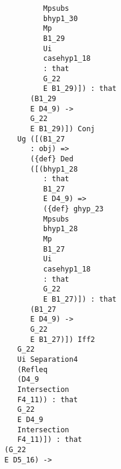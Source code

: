\documentclass[12pt]{article}
\begin{document}
\begin{verbatim}
                                                 Mpsubs 
                                                 bhyp1_30 
                                                 Mp 
                                                 B1_29 
                                                 Ui 
                                                 casehyp1_18 
                                                 : that 
                                                 G_22 
                                                 E B1_29)]) : that 
                                              (B1_29 
                                              E D4_9) -> 
                                              G_22 
                                              E B1_29)]) Conj 
                                           Ug ([(B1_27 
                                              : obj) => 
                                              ({def} Ded 
                                              ([(bhyp1_28 
                                                 : that 
                                                 B1_27 
                                                 E D4_9) => 
                                                 ({def} ghyp_23 
                                                 Mpsubs 
                                                 bhyp1_28 
                                                 Mp 
                                                 B1_27 
                                                 Ui 
                                                 casehyp1_18 
                                                 : that 
                                                 G_22 
                                                 E B1_27)]) : that 
                                              (B1_27 
                                              E D4_9) -> 
                                              G_22 
                                              E B1_27)]) Iff2 
                                           G_22 
                                           Ui Separation4 
                                           (Refleq 
                                           (D4_9 
                                           Intersection 
                                           F4_11)) : that 
                                           G_22 
                                           E D4_9 
                                           Intersection 
                                           F4_11)]) : that 
                                        (G_22 
                                        E D5_16) -> 

\end{verbatim}
\end{document}

